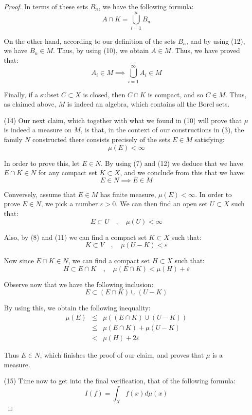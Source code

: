 \documentclass[12pt]{amsbook}
\begin{document}
\begin{proof}
In terms of these sets $B_n$, we have the following formula:
$$A\cap K=\bigcup_{i=1}^\infty B_n$$

On the other hand, according to our definition of the sets $B_n$, and by using (12), we have $B_n\in M$. Thus, by using (10), we obtain $A\in M$. Thus, we have proved that:
$$A_i\in M\implies \bigcup_{i=1}^\infty A_i\in M$$

Finally, if a subset $C\subset X$ is closed, then $C\cap K$ is compact, and so $C\in M$. Thus, as claimed above, $M$ is indeed an algebra, which contains all the Borel sets.

\medskip

(14) Our next claim, which together with what we found in (10) will prove that $\mu$ is indeed a measure on $M$, is that, in the context of our constructions in (3), the family $N$ constructed there consists precisely of the sets $E\in M$ satisfying:
$$\mu(E)<\infty$$

In order to prove this, let $E\in N$. By using (7) and (12) we deduce that we have $E\cap K\in N$ for any compact set $K\subset X$, and we conclude from this that we have:
$$E\in N\implies E\in M$$

Conversely, assume that $E\in M$ has finite measure, $\mu(E)<\infty$. In order to prove $E\in N$, we pick a number $\varepsilon>0$. We can then find an open set $U\subset X$ such that:
$$E\subset U\quad,\quad\mu(U)<\infty$$

Also, by (8) and (11) we can find a compact set $K\subset X$ such that:
$$K\subset V\quad,\quad\mu(U-K)<\varepsilon$$

Now since $E\cap K\in N$, we can find a compact set $H\subset X$ such that:
$$H\subset E\cap K\quad,\quad\mu(E\cap K)<\mu(H)+\varepsilon$$

Observe now that we have the following inclusion:
$$E\subset(E\cap K)\cup(U-K)$$

By using this, we obtain the following inequality:
\begin{eqnarray*}
\mu(E)
&\leq&\mu\left((E\cap K)\cup(U-K)\right)\\
&\leq&\mu(E\cap K)+\mu(U-K)\\
&<&\mu(H)+2\varepsilon
\end{eqnarray*}

Thus $E\in N$, which finishes the proof of our claim, and proves that $\mu$ is a measure.

\medskip

(15) Time now to get into the final verification, that of the following formula:
$$I(f)=\int_Xf(x)d\mu(x)$$


\end{proof}
\end{document}
